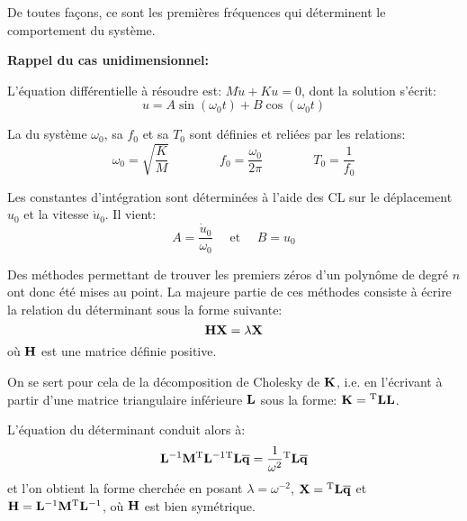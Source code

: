 \medskip
{} 

De toutes façons, ce sont les premières fréquences qui déterminent le comportement du système.

\medskip
{}
\textbf{Rappel du cas unidimensionnel:}

L'équation différentielle à résoudre est: $M\ddot{u}+Ku=0$,
dont la solution s'écrit: \begin{equation} u=A\sin (\omega_0 t)+B\cos(\omega_0 t) \end{equation}

La  du système $\omega_0$, sa  $f_0$
et sa  $T_0$ sont définies et reliées par les relations:
\begin{equation}
\omega_0=\sqrt{\dfrac{K}M} \qquad\qquad f_0=\dfrac{\omega_0}{2\pi} \qquad\qquad T_0=\dfrac1{f_0}
\end{equation}

Les constantes d'intégration sont déterminées à l'aide des CL sur le déplacement $u_0$ et la
vitesse $\dot{u}_0$. Il vient: \begin{equation} A=\frac{\dot{u}_0}{\omega_0} \quad\text{ et }\quad B=u_0\end{equation}


\medskip{}
Des méthodes permettant de trouver les premiers zéros d'un polynôme de degré $n$ ont donc été 
mises au point. 
La majeure partie de ces méthodes consiste à écrire la relation du déterminant sous la forme suivante:
\begin{equation} \mathbf{H}\mathbf{X}=\lambda\mathbf{X} \end{equation}
où $\mathbf{H}$ est une matrice définie positive.

On se sert pour cela de la décomposition de Cholesky 
de $\mathbf{K}$, i.e. en l'écrivant à partir d'une matrice triangulaire inférieure $\mathbf{L}$ sous la forme: $\mathbf{K}={}^\mathrm{T}\mathbf{L}\mathbf{L}$.

L'équation du déterminant conduit alors à:
\begin{equation} \mathbf{L}^{-1}\mathbf{M}{}^\mathrm{T}\mathbf{L}^{-1}{}^\mathrm{T}\mathbf{L}\mathbf{\overline{q}}=\frac1{\omega^2}{}^\mathrm{T}\mathbf{L}\mathbf{\overline{q}} \end{equation}
et l'on obtient la forme cherchée en posant $\lambda=\omega^{-2}$, $\mathbf{X}={}^\mathrm{T}\mathbf{L}\mathbf{\overline{q}}$
et $\mathbf{H}=\mathbf{L}^{-1}\mathbf{M}{}^\mathrm{T}\mathbf{L}^{-1}$, où $\mathbf{H}$ est bien symétrique.

